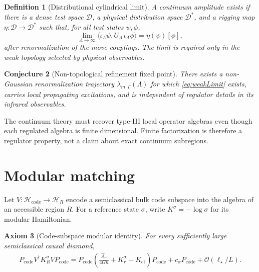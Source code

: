 \documentclass[11pt]{article}
\newtheorem{definition}{Definition}[section]
\newtheorem{axiom}[definition]{Axiom}
\newtheorem{conjecture}[definition]{Conjecture}
\theoremstyle{remark}
\newcommand{\cH}{\mathcal H}
\newcommand{\order}{\mathcal O}
\begin{document}
\begin{definition}[Distributional cylindrical limit]
A continuum amplitude exists if there is a dense test space
\(\mathcal D\), a physical distribution space \(\mathcal D^\ast\), and a
rigging map \(\eta:\mathcal D\rightarrow\mathcal D^\ast\) such that, for
all test states \(\psi,\phi\),
\begin{equation}
  \lim_{\Lambda\rightarrow\infty}
  \langle
    \iota_\Lambda\psi,
    U_\Lambda\,\iota_\Lambda\phi
  \rangle
  =
  \eta(\psi)[\phi],
  \label{eq:weakLimit}
\end{equation}
after renormalization of the move couplings.  The limit is required only
in the weak topology selected by physical observables.
\end{definition}

\begin{conjecture}[Non-topological refinement fixed point]
There exists a non-Gaussian renormalization trajectory
\(\lambda_{m,\Gamma}(\Lambda)\) for which
\eqref{eq:weakLimit} exists, carries local propagating excitations, and is
independent of regulator details in its infrared observables.
\label{conj:fixedPoint}
\end{conjecture}

The continuum theory must recover type-III local operator algebras even
though each regulated algebra is finite dimensional.  Finite
factorization is therefore a regulator property, not a claim about exact
continuum subregions.

\section{Modular matching}

Let \(V:\cH_{\mathrm{code}}\rightarrow\cH_R\) encode a semiclassical bulk
code subspace into the algebra of an accessible region \(R\).  For a
reference state \(\sigma\), write
\(K^\sigma=-\log\sigma\) for its modular Hamiltonian.

\begin{axiom}[Code-subspace modular identity]
For every sufficiently large semiclassical causal diamond,
\begin{equation}
\begin{split}
 P_{\mathrm{code}}V^\dagger K_R^\sigma V P_{\mathrm{code}}
 =
 P_{\mathrm{code}}\left(
   \frac{\widehat A_\gamma}{4G\hbar}
   +K_r^\sigma+K_{\mathrm{ct}}
 \right)P_{\mathrm{code}}
 +c_\sigma P_{\mathrm{code}}
 +\order(\ell_\star/L).
 \label{eq:modularIdentity}
\end{split}
\end{equation}
\end{axiom}
\end{document}

